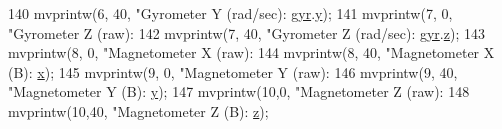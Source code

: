 \begin{DoxyCode}
{{{{{{{{{140         mvprintw(6, 40, \textcolor{stringliteral}{"Gyrometer Y (rad/sec):   %
      \hyperlink{structIMU__DATA__STRUCT_1_1calibrated_a8a54aded6ce608f1b7d2b4a0c52c248b}{gyr}.\hyperlink{structDATA__XYZ__DOUBLE_a198a27b5df3b5b0bf461b0e481e22a82}{y});
141         mvprintw(7, 0, \textcolor{stringliteral}{"Gyrometer Z (raw):     %
142         mvprintw(7, 40, \textcolor{stringliteral}{"Gyrometer Z (rad/sec):   %
      \hyperlink{structIMU__DATA__STRUCT_1_1calibrated_a8a54aded6ce608f1b7d2b4a0c52c248b}{gyr}.\hyperlink{structDATA__XYZ__DOUBLE_a9556e8868c223ff3e28756ea18a284c0}{z});
143         mvprintw(8, 0, \textcolor{stringliteral}{"Magnetometer X (raw):  %
144         mvprintw(8, 40, \textcolor{stringliteral}{"Magnetometer X (B):     %
      \hyperlink{structDATA__XYZ__DOUBLE_a22868cc99a423900e7b82d015a5eb91f}{x});
145         mvprintw(9, 0, \textcolor{stringliteral}{"Magnetometer Y (raw):  %
146         mvprintw(9, 40, \textcolor{stringliteral}{"Magnetometer Y (B):     %
      \hyperlink{structDATA__XYZ__DOUBLE_a198a27b5df3b5b0bf461b0e481e22a82}{y});
147         mvprintw(10,0, \textcolor{stringliteral}{"Magnetometer Z (raw):  %
148         mvprintw(10,40, \textcolor{stringliteral}{"Magnetometer Z (B):     %
      \hyperlink{structDATA__XYZ__DOUBLE_a9556e8868c223ff3e28756ea18a284c0}{z});
}}}}}}}}}}}}}}}}}}
\end{DoxyCode}
